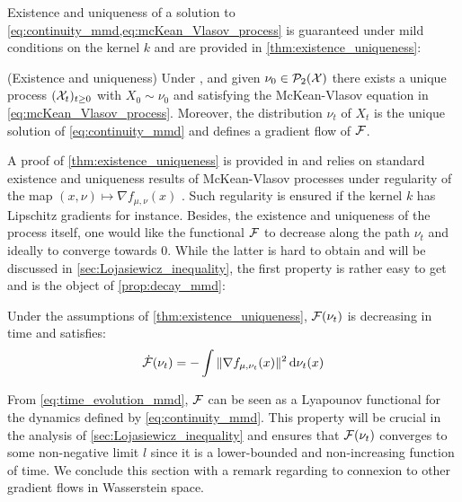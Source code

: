 Existence and uniqueness of a solution to \cref{eq:continuity_mmd,eq:mcKean_Vlasov_process} is guaranteed under mild conditions on the kernel $k$ and are provided in \cref{thm:existence_uniqueness}:
\begin{theorem}\label{thm:existence_uniqueness}(Existence and uniqueness)
	Under , and given $\nu_0\in \mathcal{P}_2({{\mathcal X}})$ there exists a unique process $({{\mathcal X}}_t)_{t\geq 0}$ with $X_0\sim \nu_0$ and satisfying the McKean-Vlasov equation in \cref{eq:mcKean_Vlasov_process}. Moreover, the distribution $\nu_t$ of $X_t$ is the unique solution of \cref{eq:continuity_mmd} and defines a gradient flow of ${{\mathcal F}}$. 
\end{theorem}
A proof of \cref{thm:existence_uniqueness} is provided in  and relies on standard existence and uniqueness results of McKean-Vlasov processes under regularity of the map $(x,\nu)\mapsto \nabla f_{\mu,\nu}(x)$ \cite{Jourdain:2007}. Such regularity is ensured if the kernel $k$ has Lipschitz gradients for instance. Besides, the existence and uniqueness of the process itself, one would like the functional ${{\mathcal F}}$ to decrease along the path $\nu_t$ and ideally to converge towards $0$. While the latter is hard to obtain and will be discussed in \cref{sec:Lojasiewicz_inequality}, the first property is rather easy to get and is the object of \cref{prop:decay_mmd}:
\begin{proposition}\label{prop:decay_mmd}
	Under the assumptions of \cref{thm:existence_uniqueness}, ${{\mathcal F}}(\nu_t)$ is decreasing in time and satisfies:
	\begin{align}\label{eq:time_evolution_mmd}
		\dot{{{\mathcal F}}}(\nu_t)= - \int \Vert \nabla f_{\mu,\nu_t}(x) \Vert^2 \mathop{}\!\mathrm{d} \nu_t(x)  
	\end{align}
\end{proposition}
From \cref{eq:time_evolution_mmd}, ${{\mathcal F}}$ can be seen as a Lyapounov functional for the dynamics defined by \cref{eq:continuity_mmd}. This property will be crucial in the analysis of \cref{sec:Lojasiewicz_inequality} and ensures that ${{\mathcal F}}(\nu_t)$  converges to some non-negative limit $l$ since it is a lower-bounded and non-increasing function of time. We conclude this section with a remark regarding to connexion to other gradient flows in Wasserstein space.
